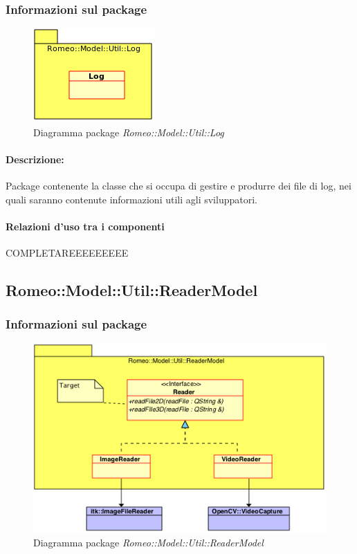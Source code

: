 		\subsubsection{Informazioni sul package}
			\begin{figure}[!h]
				\centering
				\includegraphics[scale=0.5]{./Content/Immagini/Romeo__Model__Util__Log.png}
				\caption{Diagramma package \textsl{Romeo::Model::Util::Log}}
			\end{figure}
			\paragraph{Descrizione:}Package\g{} contenente la classe che si occupa di gestire e produrre dei file di log, nei quali saranno contenute informazioni utili agli sviluppatori.
			\paragraph{Relazioni d'uso tra i componenti}
COMPLETAREEEEEEEEE	\subsection{Romeo::Model::Util::ReaderModel}
		\subsubsection{Informazioni sul package}
			\begin{figure}[!h]
				\centering
				\includegraphics[scale=0.5]{./Content/Immagini/Romeo__Model__Util__ReaderModel.png}
				\caption{Diagramma package \textsl{Romeo::Model::Util::ReaderModel}}
			\end{figure}
